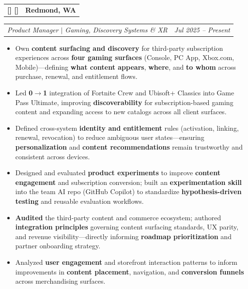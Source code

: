 \documentclass[11pt]{article}
\makeatletter
\newcommand{\FirstBig}[1]{%
  \StrLeft{#1}{1}[\FirstChar]%
  \StrGobbleLeft{#1}{1}[\RestChars]%
  {\large\bfseries\FirstChar}\RestChars%
}
\newcommand{\twocol}[2]{%
  \begin{tabularx}{\linewidth}{@{}X r@{}}
    \textbf{\FirstBig{#1}} & \textbf{#2} \\
  \end{tabularx}
}
\newcommand{\roleline}[2]{%
  \begin{tabularx}{\linewidth}{@{}X r@{}}
    \textit{#1} & \textit{#2} \\
  \end{tabularx}
}
\makeatother
\begin{document}
\twocol{Microsoft --- Xbox}{Redmond, WA}
\roleline{Product Manager $|$ Gaming, Discovery Systems \& XR}{Jul 2025 -- Present}
\begin{itemize}
  \item Own \textbf{content surfacing and discovery} for third-party subscription experiences across \textbf{four gaming surfaces} (Console, PC App, Xbox.com, Mobile)---defining \textbf{what content appears}, \textbf{where}, and \textbf{to whom} across purchase, renewal, and entitlement flows.
  \item Led \textbf{0$\to$1} integration of Fortnite Crew and Ubisoft+ Classics into Game Pass Ultimate, improving \textbf{discoverability} for subscription-based gaming content and expanding access to new catalogs across all client surfaces.
  \item Defined cross-system \textbf{identity and entitlement} rules (activation, linking, renewal, revocation) to reduce ambiguous user states---ensuring \textbf{personalization} and \textbf{content recommendations} remain trustworthy and consistent across devices.
  \item Designed and evaluated \textbf{product experiments} to improve \textbf{content engagement} and subscription conversion; built an \textbf{experimentation skill} into the team AI repo (GitHub Copilot) to standardize \textbf{hypothesis-driven testing} and reusable evaluation workflows.
  \item \textbf{Audited} the third-party content and commerce ecosystem; authored \textbf{integration principles} governing content surfacing standards, UX parity, and revenue visibility---directly informing \textbf{roadmap prioritization} and partner onboarding strategy.
  \item Analyzed \textbf{user engagement} and storefront interaction patterns to inform improvements in \textbf{content placement}, navigation, and \textbf{conversion funnels} across merchandising surfaces.
\end{itemize}
\end{document}
